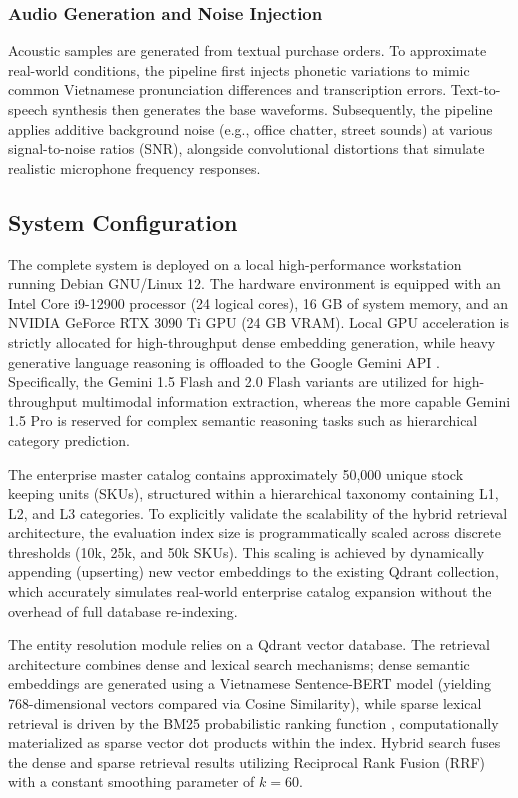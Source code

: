 \subsubsection{Audio Generation and Noise Injection}
Acoustic samples are generated from textual purchase orders. To approximate real-world conditions, the pipeline first injects phonetic variations to mimic common Vietnamese pronunciation differences and transcription errors. Text-to-speech synthesis then generates the base waveforms. Subsequently, the pipeline applies additive background noise (e.g., office chatter, street sounds) at various signal-to-noise ratios (SNR), alongside convolutional distortions that simulate realistic microphone frequency responses.

\subsection{System Configuration}
The complete system is deployed on a local high-performance workstation running Debian GNU/Linux 12. The hardware environment is equipped with an Intel Core i9-12900 processor (24 logical cores), 16 GB of system memory, and an NVIDIA GeForce RTX 3090 Ti GPU (24 GB VRAM). Local GPU acceleration is strictly allocated for high-throughput dense embedding generation, while heavy generative language reasoning is offloaded to the Google Gemini API \parencite{team2023gemini}. Specifically, the Gemini 1.5 Flash and 2.0 Flash variants are utilized for high-throughput multimodal information extraction, whereas the more capable Gemini 1.5 Pro is reserved for complex semantic reasoning tasks such as hierarchical category prediction.

The enterprise master catalog contains approximately 50,000 unique stock keeping units (SKUs), structured within a hierarchical taxonomy containing L1, L2, and L3 categories. To explicitly validate the scalability of the hybrid retrieval architecture, the evaluation index size is programmatically scaled across discrete thresholds (10k, 25k, and 50k SKUs). This scaling is achieved by dynamically appending (upserting) new vector embeddings to the existing Qdrant collection, which accurately simulates real-world enterprise catalog expansion without the overhead of full database re-indexing.

The entity resolution module relies on a Qdrant vector database. The retrieval architecture combines dense and lexical search mechanisms; dense semantic embeddings are generated using a Vietnamese Sentence-BERT model \parencite{reimers2019sentence} (yielding 768-dimensional vectors compared via Cosine Similarity), while sparse lexical retrieval is driven by the BM25 probabilistic ranking function \parencite{robertson2009probabilistic}, computationally materialized as sparse vector dot products within the index. Hybrid search fuses the dense and sparse retrieval results utilizing Reciprocal Rank Fusion (RRF) \parencite{cormack2009reciprocal} with a constant smoothing parameter of $k=60$.

